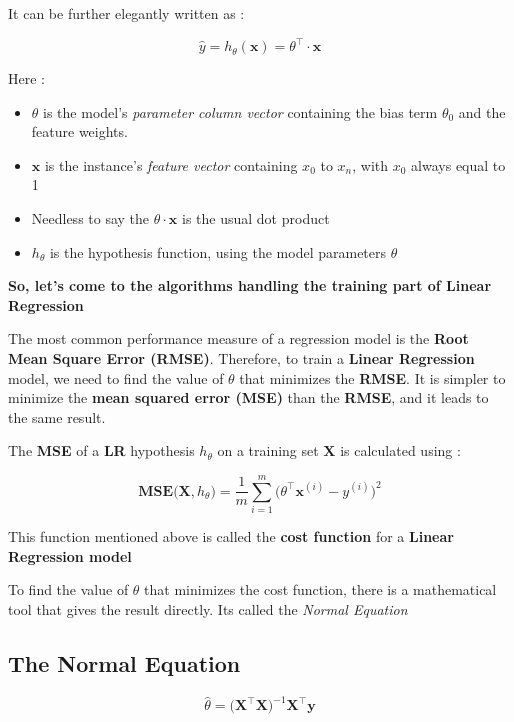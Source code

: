 \documentclass[11pt, a4paper]{book}
\begin{document}
It can be further elegantly written as :

\[\hat{y} = h_{\theta}(\textbf{x}) = \theta^{\intercal}\cdot\textbf{x}\]

Here :

\begin{itemize}
\item
  \(\theta\) is the model's \emph{parameter column vector} containing
  the bias term \(\theta_{0}\) and the feature weights.
\item
  \(\textbf{x}\) is the instance's \emph{feature vector} containing
  \(x_{0}\) to \(x_{n}\), with \(x_{0}\) always equal to 1
\item
  Needless to say the \(\theta\cdot\textbf{x}\) is the usual dot product
\item
  \(h_{\theta}\) is the hypothesis function, using the model parameters
  \(\theta\)
\end{itemize}

\textbf{So, let's come to the algorithms handling the training part of
Linear Regression}

The most common performance measure of a regression model is the
\textbf{Root Mean Square Error (RMSE)}. Therefore, to train a
\textbf{Linear Regression} model, we need to find the value of
\(\theta\) that minimizes the \textbf{RMSE}. It is simpler to minimize
the \textbf{mean squared error (MSE)} than the \textbf{RMSE}, and it
leads to the same result.

The \textbf{MSE} of a \textbf{LR} hypothesis \(h_{\theta}\) on a
training set \(\mathbf{X}\) is calculated using :

\[\mathbf{MSE(X},h_{\theta}) = \frac{1}{m}\sum_{i=1}^{m} \Bigg( \theta^{\intercal}\mathbf{x}^{(i)} - y^{(i)} \Bigg)^2\]

This function mentioned above is called the \textbf{cost function} for a
\textbf{Linear Regression model}

To find the value of \(\theta\) that minimizes the cost function, there
is a mathematical tool that gives the result directly. Its called the
\emph{Normal Equation}

\hypertarget{the-normal-equation}{%
\subsection{The Normal Equation}\label{the-normal-equation}}

\[\hat{\theta} = \Big( \mathbf{X^{\intercal}X} \Big)^{-1} \mathbf{X^{\intercal}}\textbf{y}\]
\end{document}

